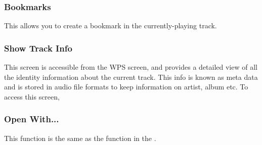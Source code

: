 \subsubsection{Bookmarks}
This allows you to create a bookmark in the currently-playing track.

\subsubsection{\label{ref:trackinfoviewer}Show Track Info}
This screen is accessible from the WPS screen, and provides a detailed view of
all the identity information about the current track. This info is known as
meta data and is stored in audio file formats to keep information on artist,
album etc. To access this screen, %
%
%
%
\subsubsection{Open With...}
This  function is the same as the  
function in the \setting{File Context Menu}.

